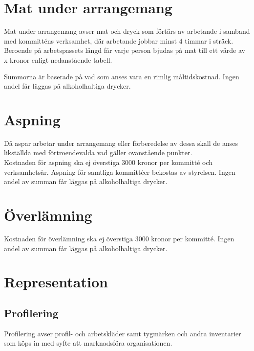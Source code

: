 \documentclass[11pt, includeaddress]{classes/cthit}
\begin{document}
\section{Mat under arrangemang}
Mat under arrangemang avser mat och dryck som förtärs av arbetande i samband med kommitténs verksamhet, där arbetande jobbar minst 4 timmar i sträck. Beroende på arbetspassets längd får varje person bjudas på mat till ett värde av x kronor enligt nedanstående tabell.

\addvbuffer[\the\baselineskip]{\begin{tabular}{ l  c  c  c  c}
	\centering
	Timmar & [0-4] & (4-9] & (9-13] & (13-$\infty$] \\
	\hline
	Kronor & 0 & 30 & 60 & 90 \\
\end{tabular}}

Summorna är baserade på vad som anses vara en rimlig måltidskostnad. Ingen andel får läggas på alkoholhaltiga drycker.

\section{Aspning}
Då aspar arbetar under arrangemang eller förberedelse av dessa skall de anses likställda med förtroendevalda vad gäller ovanstående punkter. \\

Kostnaden för aspning ska ej överstiga 3000 kronor per kommitté och verksamhetsår.
Aspning för samtliga kommittéer bekostas av styrelsen. Ingen andel av summan får läggas på alkoholhaltiga drycker.

\section{Överlämning}
Kostnaden för överlämning ska ej överstiga 3000 kronor per kommitté. Ingen andel av summan får läggas på alkoholhaltiga drycker.

\section{Representation}

\subsection{Profilering}
Profilering avser profil- och arbetskläder samt tygmärken och andra inventarier som köps in med syfte att marknadsföra organisationen. \\
\end{document}

